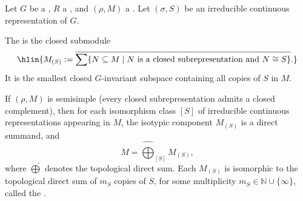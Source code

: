 \begin{definition} \label{definition:isotypic_component_of_a_continuous_representation_of_a_topological_group_on_a_topological_module_over_a_topological_ring_for_an_irreducible_representation}

    Let $G$ be a , $R$ a , and $(\rho, M)$ a . Let $(\sigma, S)$ be an irreducible continuous representation of $G$.

    The  is the closed submodule
    $$\hlin{M_{(S)} := \overline{\sum \{N \subseteq M \mid N \text{ is a closed subrepresentation and } N \cong S\}}.}$$
    It is the smallest closed $G$-invariant subspace containing all copies of $S$ in $M$.

    If $(\rho, M)$ is semisimple (every closed subrepresentation admits a closed complement), then for each isomorphism class $[S]$ of irreducible continuous representations appearing in $M$, the isotypic component $M_{(S)}$ is a direct summand, and
    $$ M = \widehat{\bigoplus}_{[S]} M_{(S)},$$
    where $\widehat{\bigoplus}$ denotes the topological direct sum. Each $M_{(S)}$ is isomorphic to the topological direct sum of $m_S$ copies of $S$, for some multiplicity $m_S \in \mathbb{N} \cup \{\infty\}$, called the .
\end{definition}

